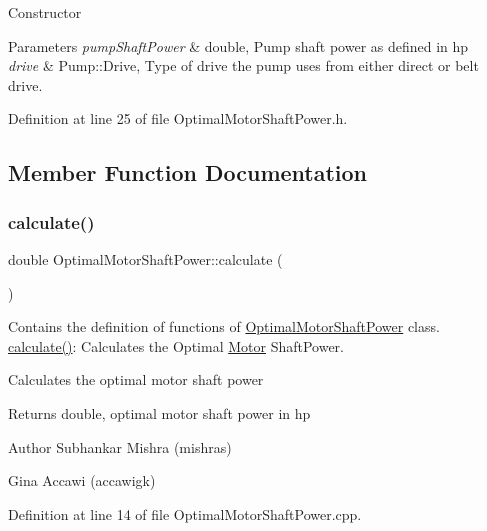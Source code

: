 Constructor 
\begin{DoxyParams}{Parameters}
{\em pump\+Shaft\+Power} & double, Pump shaft power as defined in hp \\
\hline
{\em drive} & Pump\+::\+Drive, Type of drive the pump uses from either direct or belt drive. \\
\hline
\end{DoxyParams}


Definition at line 25 of file Optimal\+Motor\+Shaft\+Power.\+h.



\subsection{Member Function Documentation}
\mbox{\label{class_optimal_motor_shaft_power_a34d47733928ae518fa6f3d08b7d8a12e}} 
\subsubsection{\texorpdfstring{calculate()}{calculate()}\hspace{0.1cm}{\footnotesize\ttfamily [1/3]}}
{\footnotesize\ttfamily double Optimal\+Motor\+Shaft\+Power\+::calculate (\begin{DoxyParamCaption}{ }\end{DoxyParamCaption})}



Contains the definition of functions of \hyperlink{class_optimal_motor_shaft_power}{Optimal\+Motor\+Shaft\+Power} class. \hyperlink{class_optimal_motor_shaft_power_a34d47733928ae518fa6f3d08b7d8a12e}{calculate()}\+: Calculates the Optimal \hyperlink{struct_motor}{Motor} Shaft\+Power. 

Calculates the optimal motor shaft power \begin{DoxyReturn}{Returns}
double, optimal motor shaft power in hp
\end{DoxyReturn}
\begin{DoxyAuthor}{Author}
Subhankar Mishra (mishras) 

Gina Accawi (accawigk) 
\end{DoxyAuthor}


Definition at line 14 of file Optimal\+Motor\+Shaft\+Power.\+cpp.

